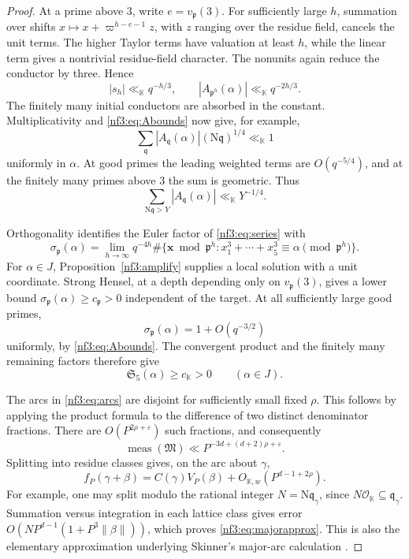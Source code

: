 \documentclass[11pt,letterpaper]{article}
\theoremstyle{definition}
\numberwithin{equation}{section}
\begin{document}
\begin{proof}
At a prime above $3$, write $e=v_\mathfrak p(3)$. For sufficiently large $h$, summation over shifts $x\mapsto x+\varpi^{h-e-1}z$, with $z$ ranging over the residue field, cancels the unit terms. The higher Taylor terms have valuation at least $h$, while the linear term gives a nontrivial residue-field character. The nonunits again reduce the conductor by three. Hence
\[
 |s_h|\ll_{\mathbb K} q^{-h/3},\qquad
 |A_{\mathfrak p^h}(\alpha)|\ll_{\mathbb K} q^{-2h/3}.
\]
The finitely many initial conductors are absorbed in the constant. Multiplicativity and \eqref{nf3:eq:Abounds} now give, for example,
\begin{equation}\label{nf3:eq:weightedtail}
 \sum_\mathfrak q |A_\mathfrak q(\alpha)|(\mathrm N\mathfrak q)^{1/4}\ll_{\mathbb K}1
\end{equation}
uniformly in $\alpha$. At good primes the leading weighted terms are $O(q^{-5/4})$, and at the finitely many primes above $3$ the sum is geometric. Thus
\begin{equation}\label{nf3:eq:seriestail}
 \sum_{\mathrm N\mathfrak q>Y}|A_\mathfrak q(\alpha)|\ll_{\mathbb K}Y^{-1/4}.
\end{equation}

Orthogonality identifies the Euler factor of \eqref{nf3:eq:series} with
\[
 \sigma_\mathfrak p(\alpha)
 =\lim_{h\to\infty}q^{-4h}
 \#\{\mathbf x\bmod\mathfrak p^h:x_1^3+\cdots+x_5^3\equiv\alpha\pmod{\mathfrak p^h}\}.
\]
For $\alpha\in J$, Proposition~\ref{nf3:amplify} supplies a local solution with a unit coordinate. Strong Hensel, at a depth depending only on $v_\mathfrak p(3)$, gives a lower bound $\sigma_\mathfrak p(\alpha)\ge c_\mathfrak p>0$ independent of the target. At all sufficiently large good primes,
\[
 \sigma_\mathfrak p(\alpha)=1+O(q^{-3/2})
\]
uniformly, by \eqref{nf3:eq:Abounds}. The convergent product and the finitely many remaining factors therefore give
\begin{equation}\label{nf3:eq:lowerS}
 \mathfrak S_5(\alpha)\ge c_{\mathbb K}>0\qquad(\alpha\in J).
\end{equation}


The arcs in \eqref{nf3:eq:arcs} are disjoint for sufficiently small fixed $\rho$. This follows by applying the product formula to the difference of two distinct denominator fractions. There are $O(P^{2\rho+\varepsilon})$ such fractions, and consequently
\begin{equation}\label{nf3:eq:majormeasure}
 \operatorname{meas}(\mathfrak M)\ll P^{-3d+(d+2)\rho+\varepsilon}.
\end{equation}
Splitting into residue classes gives, on the arc about $\gamma$,
\begin{equation}\label{nf3:eq:majorapprox}
 f_P(\gamma+\beta)=C(\gamma)V_P(\beta)
             +O_{\mathbb K,w}(P^{d-1+2\rho}).
\end{equation}
For example, one may split modulo the rational integer $N=\mathrm N\mathfrak q_\gamma$, since $N\mathcal O_{\mathbb K}\subseteq\mathfrak q_\gamma$. Summation versus integration in each lattice class gives error
$O(NP^{d-1}(1+P^3\|\beta\|))$, which proves \eqref{nf3:eq:majorapprox}. This is also the elementary approximation underlying Skinner's major-arc calculation \cite[proof of Lemma 7]{nf3:skinner}.


\end{proof}
\end{document}
